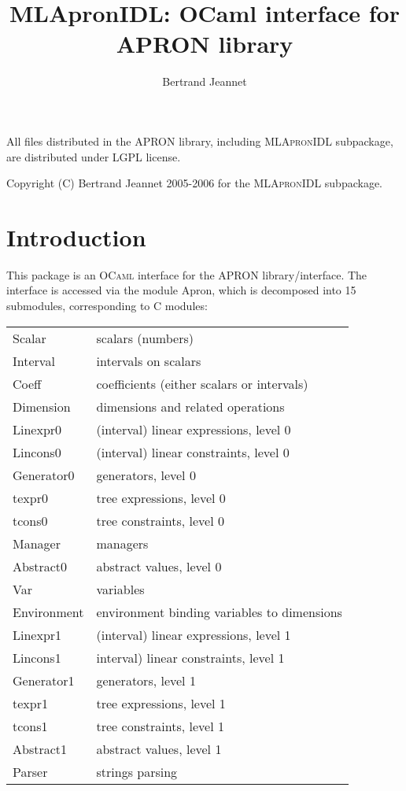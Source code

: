 \documentclass[twoside,10pt,a4paper]{report}
\title{MLApronIDL: OCaml interface for APRON library}
\author{Bertrand Jeannet}
\begin{document}
\maketitle

\vspace*{0.9\textheight}

All files distributed in the APRON library, including \textsc{MLApronIDL}
subpackage, are distributed under LGPL license.

Copyright (C) Bertrand Jeannet 2005-2006 for the
\textsc{MLApronIDL} subpackage.

\newpage

\tableofcontents

\chapter{Introduction}

This package is an \textsc{OCaml} interface for the APRON
library/interface.  The interface is accessed via the module
Apron, which is decomposed into 15 submodules, corresponding to C
modules:

\noindent
\begin{tabular}{l@{~:~~}l}
Scalar     & scalars (numbers) \\
Interval   & intervals on scalars \\
Coeff      & coefficients (either scalars or intervals) \\
Dimension  & dimensions and related operations \\
Linexpr0   & (interval) linear expressions, level 0 \\
Lincons0   & (interval) linear constraints, level 0 \\
Generator0 & generators, level 0 \\
texpr0     & tree expressions, level 0 \\
tcons0     & tree constraints, level 0 \\
Manager    & managers \\
Abstract0  & abstract values, level 0 \\
Var        & variables \\
Environment& environment binding variables to dimensions \\
Linexpr1   & (interval) linear expressions, level 1 \\
Lincons1   & interval) linear constraints, level 1 \\
Generator1 & generators, level 1 \\
texpr1     & tree expressions, level 1 \\
tcons1     & tree constraints, level 1 \\
Abstract1  & abstract values, level 1 \\
Parser     & strings parsing 
\end{tabular}
\end{document}
